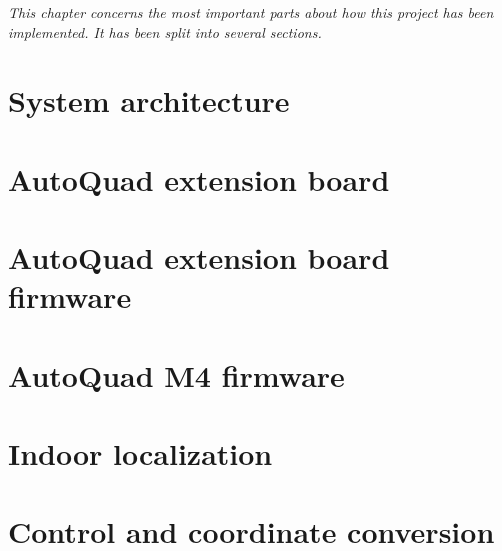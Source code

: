 \textit{This chapter concerns the most important parts about how this project has been implemented. It has been split into several sections.}

\section{System architecture}


\section{AutoQuad extension board} \label{sec:autoquad_extension_board}


\section{AutoQuad extension board firmware} \label{sec:extension_board_firmware}


\section{AutoQuad M4 firmware} \label{sec:aq_m4_firmware}


%

%






\section{Indoor localization} \label{sec:indoor_localization}


\section{Control and coordinate conversion}
\label{sec:control_and_coordinate_conversion}
%


